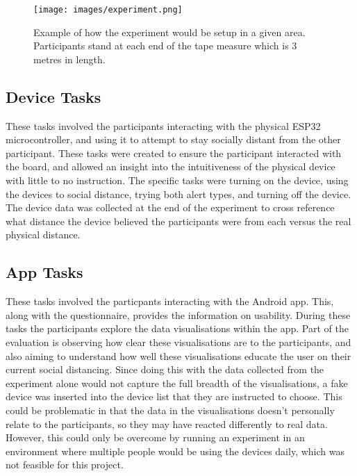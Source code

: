 \documentclass{l4proj}
\begin{document}
\begin{figure}[!htb]
    \centering
    \texttt{[image: images/experiment.png]}

    \caption{ Example of how the experiment would be setup in a given area. Participants stand at each end of the tape measure which is 3 metres in length. }

    \label{fig:experiment_setup}
\end{figure}

\subsection{Device Tasks}

These tasks involved the participants interacting with the physical ESP32 microcontroller, and using it to attempt to stay socially distant from the other participant. These tasks were created to ensure the participant interacted with the board, and allowed an insight into the intuitiveness of the physical device with little to no instruction. The specific tasks were turning on the device, using the devices to social distance, trying both alert types, and turning off the device. The device data was collected at the end of the experiment to cross reference what distance the device believed the participants were from each versus the real physical distance.

\subsection{App Tasks}

These tasks involved the particpants interacting with the Android app. This, along with the questionnaire, provides the information on usability. During these tasks the participants explore the data visualisations within the app. Part of the evaluation is observing how clear these visualisations are to the participants, and also aiming to understand how well these visualisations educate the user on their current social distancing. Since doing this with the data collected from the experiment alone would not capture the full breadth of the visualisations, a fake device was inserted into the device list that they are instructed to choose. This could be problematic in that the data in the visualisations doesn't personally relate to the participants, so they may have reacted differently to real data. However, this could only be overcome by running an experiment in an environment where multiple people would be using the devices daily, which was not feasible for this project.
\end{document}
